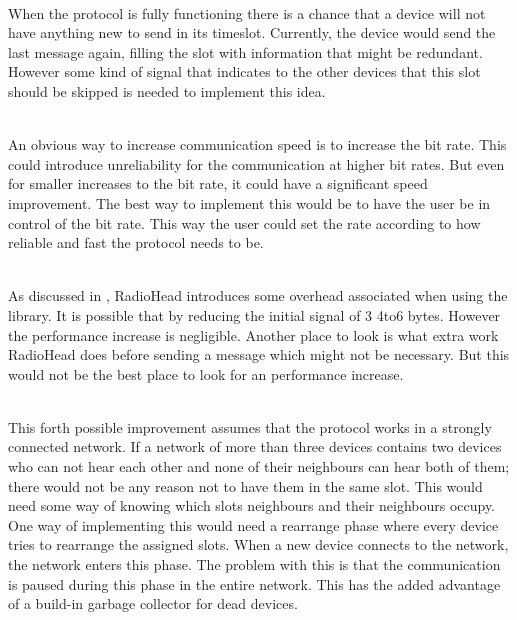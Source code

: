 \begin{description}[labelindent=\parindent]
    \item [Skip unnessary transmissions]\hfill\\
When the protocol is fully functioning there is a chance that a device will not have anything new to send in its timeslot.
Currently, the device would send the last message again, filling the slot with information that might be redundant.
However some kind of signal that indicates to the other devices that this slot should be skipped is needed to implement this idea.

    \item[Increase the bit rate]\hfill\\ 
An obvious way to increase communication speed is to increase the bit rate.
This could introduce unreliability for the communication at higher bit rates. 
But even for smaller increases to the bit rate, it could have a significant speed improvement.
The best way to implement this would be to have the user be in control of the bit rate.
This way the user could set the rate according to how reliable and fast the protocol needs to be.

    \item[Reduce overhead]\hfill\\
As discussed in , RadioHead introduces some overhead associated when using the library.
It is possible that by reducing the initial signal of 3 4to6 bytes. 
However the performance increase is negligible.
Another place to look is what extra work RadioHead does before sending a message which might not be necessary.
But this would not be the best place to look for an performance increase.

    \item[Parallelise communication]\hfill\\
This forth possible improvement assumes that the protocol works in a strongly connected network. 
If a network of more than three devices contains two devices who can not hear each other and none of their neighbours can hear both of them; there would not be any reason not to have them in the same slot.
This would need some way of knowing which slots neighbours and their neighbours occupy.
One way of implementing this would need a rearrange phase where every device tries to rearrange the assigned slots.
When a new device connects to the network, the network enters this phase.
The problem with this is that the communication is paused during this phase in the entire network.
This has the added advantage of a build-in garbage collector for dead devices.
\end{description}

